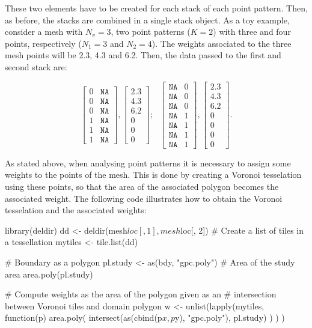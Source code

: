 \medskip
These two elements have to be created for each stack of each point pattern. Then, as before, the stacks are combined in a single stack object. As a toy example, consider a mesh with $N_v =3$, two point patterns ($K=2$) with three and four points, respectively ($N_1=3$ and $N_2=4$). The weights associated to the three mesh points will be 2.3, 4.3 and 6.2. Then, the data passed to the first and second stack are:


$$ 
\begin{bmatrix}
0 & \texttt{NA}\\
0 & \texttt{NA}\\
0 & \texttt{NA}\\
1 & \texttt{NA}\\
1 & \texttt{NA}\\
1 & \texttt{NA}
\end{bmatrix},
\begin{bmatrix}
2.3\\
4.3\\
6.2\\
0\\
0\\
0
\end{bmatrix}; \ \ \ 
\begin{bmatrix}
\texttt{NA} & 0  \\
\texttt{NA} & 0  \\
\texttt{NA} & 0  \\
\texttt{NA} & 1  \\
\texttt{NA} & 1  \\
\texttt{NA} & 1  \\
\texttt{NA} & 1  
\end{bmatrix}, 
\begin{bmatrix} 
2.3\\
4.3\\
6.2\\
0\\
0\\
0\\
0
\end{bmatrix} .
$$


As stated above, when analysing point patterns it is necessary to assign some
weights to the points of the mesh. This is done by creating a Voronoi
tesselation using these points, so that the area of the associated polygon
becomes the associated weight. The following code illustrates how to obtain the
Voronoi tesselation and the associated weights:
 
\begin{example*}
library(deldir)
dd <- deldir(mesh$loc[, 1],mesh$loc[, 2])
# Create a list of tiles in a tessellation
mytiles <- tile.list(dd)

# Boundary as a polygon
pl.study <- as(bdy, "gpc.poly")
# Area of the study area
area.poly(pl.study)

# Compute weights as the area of the polygon given as an
# intersection between Voronoi tiles and domain polygon
w <- unlist(lapply(mytiles,
  function(p) area.poly(
    intersect(as(cbind(p$x,p$y), "gpc.poly"), pl.study)
    )
  )
)
\end{example*}

